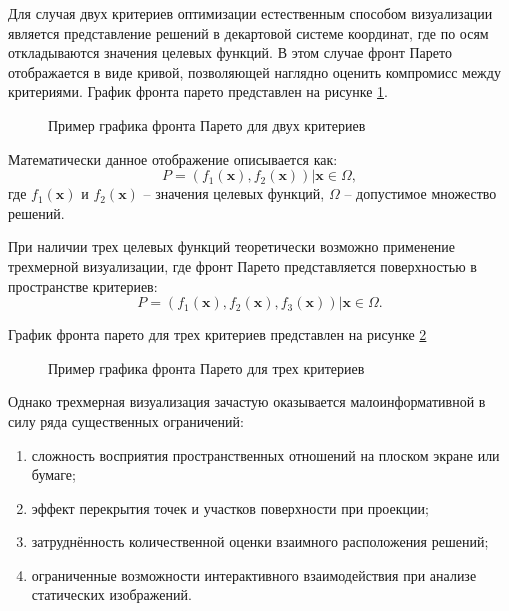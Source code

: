 Для случая двух критериев оптимизации естественным способом визуализации является представление
решений в декартовой системе координат, где по осям откладываются значения целевых функций. В этом
случае фронт Парето отображается в виде кривой, позволяющей наглядно оценить компромисс между
критериями. График фронта парето представлен на рисунке \ref{img4:pareto_front_2_example}.

\begin{figure}[ht]
	\caption{Пример графика фронта Парето для двух критериев}
	\label{img4:pareto_front_2_example}
\end{figure}

Математически данное отображение описывается как:
\begin{equation}
	P = {(f_1(\mathbf{x}), f_2(\mathbf{x})) | \mathbf{x} \in \Omega },
\end{equation}
где $f_1(\mathbf{x})$ и $f_2(\mathbf{x})$ -- значения целевых функций, $\Omega$ -- допустимое множество решений.


При наличии трех целевых функций теоретически возможно применение трехмерной визуализации, где фронт Парето представляется поверхностью в пространстве критериев:
\begin{equation}
	P = {(f_1(\mathbf{x}), f_2(\mathbf{x}), f_3(\mathbf{x})) | \mathbf{x} \in \Omega }.
\end{equation}

График фронта парето для трех критериев представлен на рисунке \ref{img4:pareto_front_3_example} 

\begin{figure}[ht]
	\caption{Пример графика фронта Парето для трех критериев}
	\label{img4:pareto_front_3_example}
\end{figure}

Однако трехмерная визуализация зачастую оказывается малоинформативной в силу ряда существенных ограничений:

\begin{enumerate}
	\item сложность восприятия пространственных отношений на плоском экране или бумаге;
	\item эффект перекрытия точек и участков поверхности при проекции;
	\item затруднённость количественной оценки взаимного расположения решений;
	\item ограниченные возможности интерактивного взаимодействия при анализе статических изображений.
\end{enumerate}

